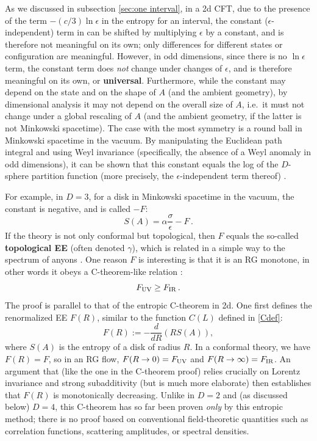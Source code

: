 \documentclass[11pt]{article}
\begin{document}
As we discussed in subsection \ref{sec:one interval}, in a 2d CFT, due to the presence of the term $-(c/3)\ln\epsilon$ in the entropy for an interval, the constant ($\epsilon$-independent) term in can be shifted by multiplying $\epsilon$ by a constant, and is therefore not meaningful on its own; only differences for different states or configuration are meaningful. However, in odd dimensions, since there is no $\ln\epsilon$ term, the constant term does \emph{not} change under changes of $\epsilon$, and is therefore meaningful on its own, or \textbf{universal}. Furthermore, while the constant may depend on the state and on the shape of $A$ (and the ambient geometry), by dimensional analysis it may not depend on the overall size of $A$, i.e.\ it must not change under a global rescaling of $A$ (and the ambient geometry, if the latter is not Minkowski spacetime). The case with the most symmetry is a round ball in Minkowski spacetime in the vacuum. By manipulating the Euclidean path integral and using Weyl invariance (specifically, the absence of a Weyl anomaly in odd dimensions), it can be shown that this constant equals the log of  the $D$-sphere partition function (more precisely, the $\epsilon$-independent term thereof) \cite{Casini:2011kv}.

For example, in $D=3$, for a disk in Minkowski spacetime in the vacuum, the constant is negative, and is called $-F$:
\begin{equation}
S(A) = \alpha\frac\sigma\epsilon -F\,.
\end{equation}
If the theory is not only conformal but topological, then $F$ equals the so-called \textbf{topological EE} (often denoted $\gamma$), which is related in a simple way to the spectrum of anyons \cite{Kitaev:2005dm,2006PhRvL..96k0405L}. One reason $F$ is interesting is that it is an RG monotone, in other words it obeys a C-theorem-like relation \cite{Casini:2012ei}:
\begin{equation}
F_{\rm UV}\ge F_{\rm IR}\,.
\end{equation}
The proof is parallel to that of the entropic C-theorem in 2d. One first defines the renormalized EE $F(R)$, similar to the function $C(L)$ defined in \eqref{Cdef}:
\begin{equation}
F(R):=-\frac d{dR}\left(RS(A)\right),
\end{equation}
where $S(A)$ is the entropy of a disk of radius $R$. In a conformal theory, we have $F(R)=F$, so in an RG flow, $F(R\to0)=F_{\rm UV}$ and $F(R\to\infty)=F_{\rm IR}$. An argument that (like the one in the C-theorem proof) relies crucially on Lorentz invariance and strong subadditivity (but is much more elaborate) then establishes that $F(R)$ is monotonically decreasing. Unlike in $D=2$ and (as discussed below) $D=4$, this C-theorem has so far been proven \emph{only} by this entropic method; there is no proof based on conventional field-theoretic quantities such as correlation functions, scattering amplitudes, or spectral densities.
\end{document}
